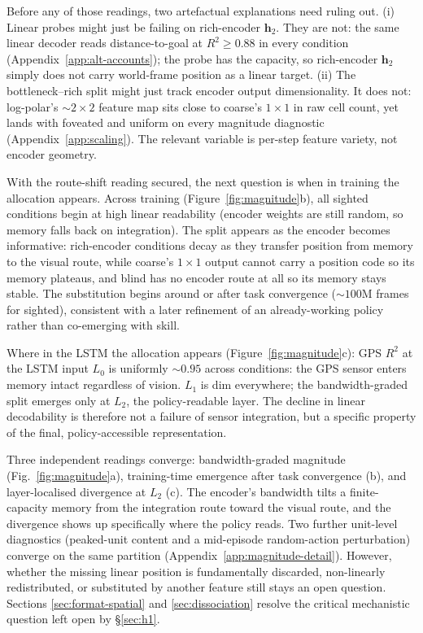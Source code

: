 \documentclass{article}
\begin{document}
\noindent Before any of those readings, two artefactual explanations need ruling out. (i) Linear probes might just be failing on rich-encoder $\mathbf{h}_2$. They are not: the same linear decoder reads distance-to-goal at $R^2 \geq 0.88$ in every condition (Appendix~\ref{app:alt-accounts}); the probe has the capacity, so rich-encoder $\mathbf{h}_2$ simply does not carry world-frame position as a linear target. (ii) The bottleneck--rich split might just track encoder output dimensionality. It does not: log-polar's $\sim 2{\times}2$ feature map sits close to coarse's $1{\times}1$ in raw cell count, yet lands with foveated and uniform on every magnitude diagnostic (Appendix~\ref{app:scaling}). The relevant variable is per-step feature variety, not encoder geometry.

\noindent With the route-shift reading secured, the next question is when in training the allocation appears. Across training (Figure~\ref{fig:magnitude}b), all sighted conditions begin at high linear readability (encoder weights are still random, so memory falls back on integration). The split appears as the encoder becomes informative: rich-encoder conditions decay as they transfer position from memory to the visual route, while coarse's $1{\times}1$ output cannot carry a position code so its memory plateaus, and blind has no encoder route at all so its memory stays stable. The substitution begins around or after task convergence (${\sim}100$M frames for sighted), consistent with a later refinement of an already-working policy rather than co-emerging with skill.

\noindent Where in the LSTM the allocation appears (Figure~\ref{fig:magnitude}c): GPS $R^2$ at the LSTM input $L_0$ is uniformly ${\sim}0.95$ across conditions: the GPS sensor enters memory intact regardless of vision. $L_1$ is dim everywhere; the bandwidth-graded split emerges only at $L_2$, the policy-readable layer. The decline in linear decodability is therefore not a failure of sensor integration, but a specific property of the final, policy-accessible representation.

\noindent Three independent readings converge: bandwidth-graded magnitude (Fig.~\ref{fig:magnitude}a), training-time emergence after task convergence (b), and layer-localised divergence at $L_2$ (c). The encoder's bandwidth tilts a finite-capacity memory from the integration route toward the visual route, and the divergence shows up specifically where the policy reads. Two further unit-level diagnostics (peaked-unit content and a mid-episode random-action perturbation) converge on the same partition (Appendix~\ref{app:magnitude-detail}). However, whether the missing linear position is fundamentally discarded, non-linearly redistributed, or substituted by another feature still stays an open question. Sections \ref{sec:format-spatial} and \ref{sec:dissociation} resolve the critical mechanistic question left open by §\ref{sec:h1}.
\end{document}
